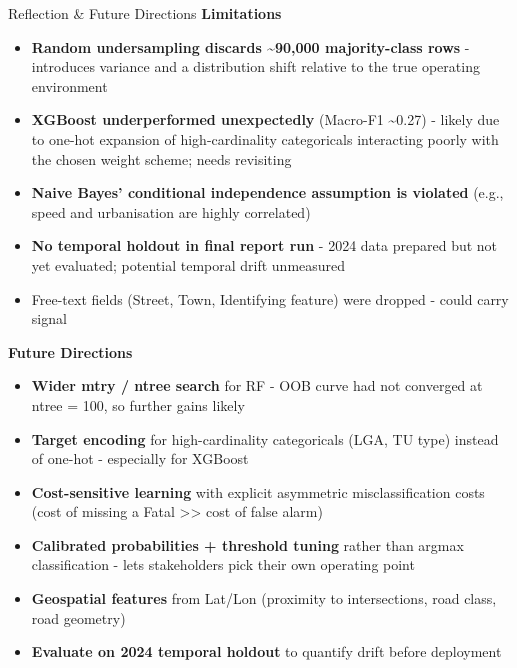 \documentclass[
  ignorenonframetext,
]{beamer}
\providecommand{\tightlist}{%
  \setlength{\itemsep}{0pt}\setlength{\parskip}{0pt}}
\begin{document}
\begin{frame}{Reflection \& Future Directions}
\label{reflection-future-directions}
\textbf{Limitations}

\begin{itemize}
\tightlist
\item
  \textbf{Random undersampling discards \textasciitilde90,000
  majority-class rows} - introduces variance and a distribution shift
  relative to the true operating environment
\item
  \textbf{XGBoost underperformed unexpectedly} (Macro-F1
  \textasciitilde0.27) - likely due to one-hot expansion of
  high-cardinality categoricals interacting poorly with the chosen
  weight scheme; needs revisiting
\item
  \textbf{Naive Bayes' conditional independence assumption is violated}
  (e.g., speed and urbanisation are highly correlated)
\item
  \textbf{No temporal holdout in final report run} - 2024 data prepared
  but not yet evaluated; potential temporal drift unmeasured
\item
  Free-text fields (Street, Town, Identifying feature) were dropped -
  could carry signal
\end{itemize}

\textbf{Future Directions}

\begin{itemize}
\tightlist
\item
  \textbf{Wider mtry / ntree search} for RF - OOB curve had not
  converged at ntree = 100, so further gains likely
\item
  \textbf{Target encoding} for high-cardinality categoricals (LGA, TU
  type) instead of one-hot - especially for XGBoost
\item
  \textbf{Cost-sensitive learning} with explicit asymmetric
  misclassification costs (cost of missing a Fatal
  \textgreater\textgreater{} cost of false alarm)
\item
  \textbf{Calibrated probabilities + threshold tuning} rather than
  argmax classification - lets stakeholders pick their own operating
  point
\item
  \textbf{Geospatial features} from Lat/Lon (proximity to intersections,
  road class, road geometry)
\item
  \textbf{Evaluate on 2024 temporal holdout} to quantify drift before
  deployment
\end{itemize}
\end{frame}
\end{document}
